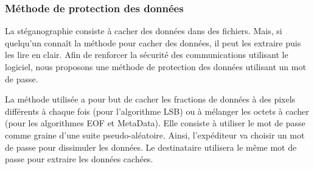 \documentclass[11pt]{article}
\begin{document}
\subsubsection{Méthode de protection des données}

La stéganographie consiste à cacher des données dans des fichiers. Mais, 
si quelqu'un connaît la méthode pour cacher des données, il peut les extraire 
puis les lire en clair. 
Afin de renforcer la sécurité des communications utilisant le logiciel, 
nous proposons une méthode de protection des données utilisant un mot de passe. 

La méthode utilisée a pour but de cacher les fractions de données à des pixels 
différents à chaque fois (pour l'algorithme LSB) ou à mélanger les octets 
à cacher (pour les algorithmes EOF et MetaData). 
Elle consiste à utiliser le mot de passe comme graine d'une suite pseudo-aléatoire. 
Ainsi, l'expéditeur va choisir un mot de passe pour dissimuler les données. 
Le destinataire utilisera le même mot de passe pour extraire les données cachées.
\end{document}
